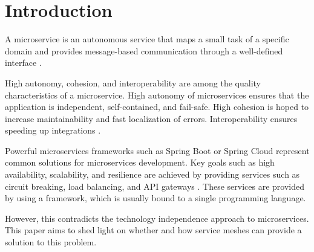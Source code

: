 \section{Introduction}

A microservice is an autonomous service that maps a small task of a specific domain and provides message-based communication through a well-defined interface \cite[p. 18]{microservices-general}.

High autonomy, cohesion, and interoperability are among the quality characteristics of a microservice. High autonomy of microservices ensures that the application is independent, self-contained, and fail-safe. High cohesion is hoped to increase maintainability and fast localization of errors. Interoperability ensures speeding up integrations \cite[p. 208 ff.]{microservices-general}.

Powerful microservices frameworks such as Spring Boot or Spring Cloud represent common solutions for microservices development. Key goals such as high availability, scalability, and resilience are achieved by providing services such as circuit breaking, load balancing, and API gateways \cite{spring-cloud}. These services are provided by using a framework, which is usually bound to a single programming language.

However, this contradicts the technology independence approach \cite{from-monolith} to microservices. This paper aims to shed light on whether and how service meshes can provide a solution to this problem.
